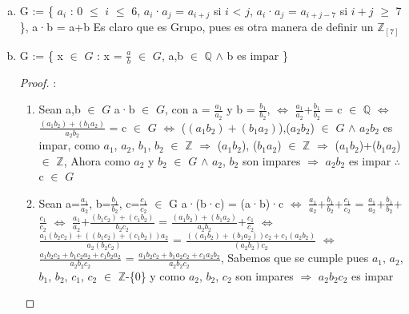 \documentclass[10pt,a4paper,oneside]{article}
\begin{document}
\begin{enumerate}[1.]
\begin{enumerate}[a)]
\begin{proof}
\begin{enumerate}[1.]
									\end{enumerate}
									$\therefore$ G no es un Grupo
								\end{proof}.
							\newline
							\item G := \{ $a_{i}$ : 0 $\leq$ $i$ $\leq$ 6, $a_i$·$a_j$ = $a_{i+j}$ si $i$ < $j$, $a_i$·$a_j$ = $a_{i+j-7}$ si $i+j$ $\geq$ 7 \}, a·b = a+b
								\newline
								Es claro que es Grupo, pues es otra manera de definir un $\mathbb{Z}_{[7]}$
							\newline
							\item G := \{ x $\in$ $G$ : x = $\frac{a}{b}$ $\in$ $G$, a,b $\in$ $\mathbb{Q}$ $\wedge$ b es impar  \}
								\newline
								\begin{proof}:
									\newline
									\begin{enumerate}[1.]
										\item Sean a,b $\in$ $G$ a·b $\in$ $G$, con a = $\frac{a_1}{a_2}$ y b = $\frac{b_1}{b_2}$, $\iff$ $\frac{a_1}{a_2}$+$\frac{b_1}{b_2}$ = c $\in$ $\mathbb{Q}$ $\iff$ $\frac{(a_1b_2)+(b_1a_2)}{a_2b_2}$ = c $\in$ $G$ $\iff$ ($(a_1b_2)+(b_1a_2)$),($a_2b_2$) $\in$ $G$ $\wedge$ $a_2b_2$ es impar, como $a_1$, $a_2$, $b_1$, $b_2$ $\in$ $\mathbb{Z}$ $\Rightarrow$ ($a_1b_2$), ($b_1a_2$) $\in$ $\mathbb{Z}$ $\Rightarrow$ ($a_1b_2$)+($b_1a_2$) $\in$ $\mathbb{Z}$, Ahora como $a_2$ y $b_2$ $\in$ $G$ $\wedge$ $a_2$, $b_2$ son impares $\Rightarrow$ $a_2$$b_2$ es impar $\therefore$ c $\in$ $G$
										\newline
										\item Sean a=$\frac{a_1}{a_2}$, b=$\frac{b_1}{b_2}$, c=$\frac{c_1}{c_2}$ $\in$ G a·(b·c) = (a·b)·c 
										$\iff$
										 $\frac{a_1}{a_2}$+$\frac{b_1}{b_2}$+$\frac{c_1}{c_2}$ = $\frac{a_1}{a_2}$+$\frac{b_1}{b_2}$+$\frac{c_1}{c_2}$ 
										 $\iff$ 
										 $\frac{a_1}{a_2}$+$\frac{(b_1c_2) + (c_1b_2)}{b_2c_2}$ = $\frac{(a_1b_2) + (b_1a_2)}{a_2b_2}$+$\frac{c_1}{c_2}$ 
										 $\iff$ 
										 $\frac{a_1(b_2c_2) + ((b_1c_2) + (c_1b_2))a_2}{a_2(b_2c_2)}$ = $\frac{((a_1b_2) + (b_1a_2))c_2 + c_1(a_2b_2)}{(a_2b_2)c_2}$ 
										 $\iff$
										 $\frac{a_1b_2c_2 + b_1c_2a_2 + c_1b_2a_2}{a_2b_2c_2}$ = $\frac{a_1b_2c_2 + b_1a_2c_2 + c_1a_2b_2}{a_2b_2c_2}$, Sabemos que se cumple pues $a_1$, $a_2$, $b_1$, $b_2$, $c_1$, $c_2$ $\in$ $\mathbb{Z}$-\{0\} y como $a_2$, $b_2$, $c_2$ son impares $\Rightarrow$ $a_2b_2c_2$ es impar
										 \newline
$$
\end{enumerate}
\end{proof}
\end{enumerate}
\end{enumerate}
\end{document}
